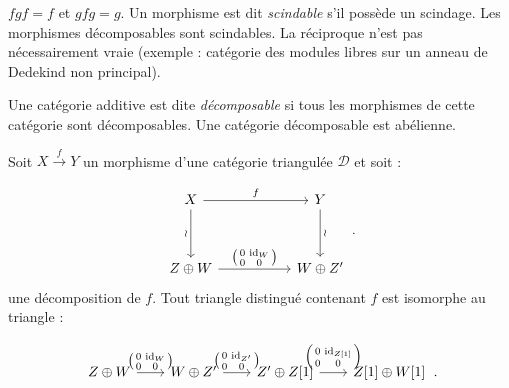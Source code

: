\clearpage
{}%
\begingroup
\small
\setlength{\abovedisplayskip}{4pt plus 2pt minus 2pt}%
\setlength{\belowdisplayskip}{4pt plus 2pt minus 2pt}%

$fgf=f$ et $gfg=g$. Un morphisme est dit \emph{scindable} s'il possède un
scindage. Les morphismes décomposables sont scindables. La réciproque n'est
pas nécessairement vraie (exemple : catégorie des modules libres sur un
anneau de Dedekind non principal).

Une catégorie additive est dite \emph{décomposable} si tous les morphismes
de cette catégorie sont décomposables. Une catégorie décomposable est
abélienne.

Soit $X\xrightarrow{f}Y$ un morphisme d'une catégorie triangulée
$\mathcal D$ et soit :

\begin{equation*}
  \begin{tikzcd}[ampersand replacement=\&,column sep=5.2em,row sep=3.4em]
    X \arrow[r,"f"] \arrow[d,"\wr"']
      \& Y \arrow[d,"\wr"] \\
    Z\oplus W
      \arrow[r,"{\left(\begin{smallmatrix}0&\operatorname{id}_W\\0&0\end{smallmatrix}\right)}"]
      \& W\oplus Z'
  \end{tikzcd}\,.
\end{equation*}
une décomposition de $f$. Tout triangle distingué contenant $f$ est
isomorphe au triangle :

\begin{equation*}
  \begin{tikzcd}[ampersand replacement=\&,column sep=2.0em]
    Z\oplus W
      \arrow[r,"{\left(\begin{smallmatrix}0&\operatorname{id}_W\\0&0\end{smallmatrix}\right)}"]
      \& W\oplus Z'
      \arrow[r,"{\left(\begin{smallmatrix}0&\operatorname{id}_{Z'}\\0&0\end{smallmatrix}\right)}"]
      \& Z'\oplus Z[1]
      \arrow[r,"{\left(\begin{smallmatrix}0&\operatorname{id}_{Z[1]}\\0&0\end{smallmatrix}\right)}"]
      \& Z[1]\oplus W[1]
  \end{tikzcd}\,.
\end{equation*}

